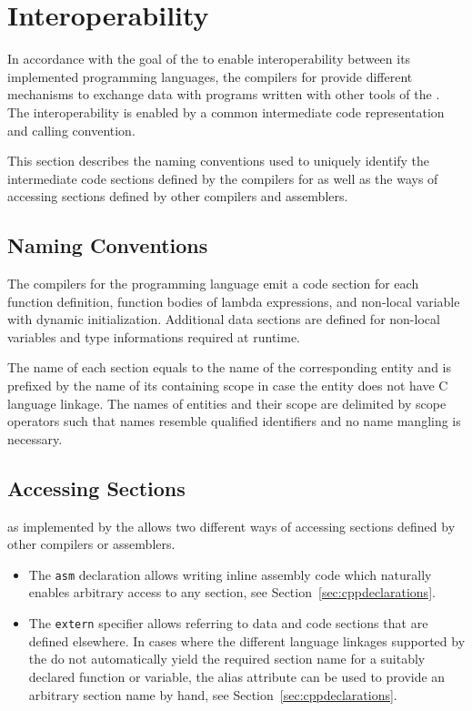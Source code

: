 \section{Interoperability}

In accordance with the goal of the \ecs{} to enable interoperability between its implemented programming languages,
the compilers for \cpp{} provide different mechanisms to exchange data with programs written with other tools of the \ecs{}.
The interoperability is enabled by a common intermediate code representation and calling convention. \seecode

This section describes the naming conventions used to uniquely identify the intermediate code sections defined by the compilers for \cpp{}
as well as the ways of accessing sections defined by other compilers and assemblers.

\subsection{Naming Conventions}\label{sec:cppnamingconventions}

The compilers for the \cpp{} programming language emit a code section for each function definition, function bodies of lambda expressions, and non-local variable with dynamic initialization.
Additional data sections are defined for non-local variables and type informations required at runtime.

The name of each section equals to the name of the corresponding entity and is prefixed by the name of its containing scope in case the entity does not have C language linkage.
The names of entities and their scope are delimited by scope operators such that names resemble qualified identifiers and no name mangling is necessary.

\subsection{Accessing Sections}

\cpp{} as implemented by the \ecs{} allows two different ways of accessing sections defined by other compilers or assemblers.

\begin{itemize}

\item
The \texttt{asm} declaration allows writing inline assembly code which naturally enables arbitrary access to any section, see Section~\ref{sec:cppdeclarations}.
\seeassembly

\item
The \texttt{extern} specifier allows referring to data and code sections that are defined elsewhere.
In cases where the different language linkages supported by the \ecs{} do not automatically yield the required section name for a suitably declared function or variable,
the alias attribute can be used to provide an arbitrary section name by hand, see Section~\ref{sec:cppdeclarations}.

\end{itemize}

